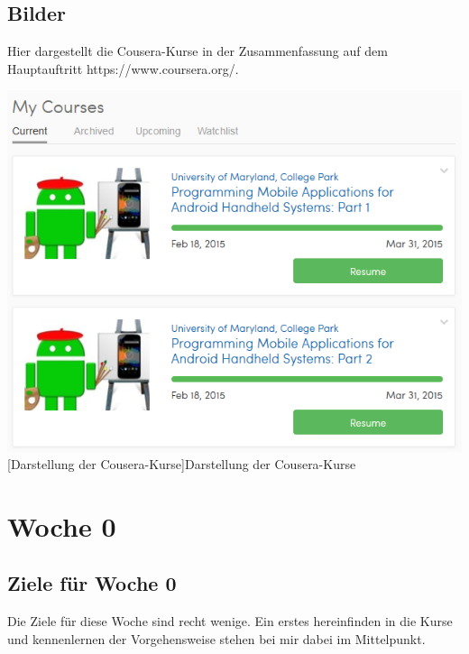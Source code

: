 \documentclass[12pt,a4paper,bibliography=totocnumbered,listof=totocnumbered]{scrartcl}
\begin{document}
\subsection{Bilder}
Hier dargestellt die Cousera-Kurse in der Zusammenfassung auf dem Hauptauftritt \textcolor[rgb]{0,0,1}{https://www.coursera.org/}.  

\vspace{1em}
\begin{minipage}{\linewidth}
	\centering
	\includegraphics[width=0.7\linewidth]{Bilder/overview.png}
	[Darstellung der Cousera-Kurse]{Darstellung der Cousera-Kurse\footnotemark }
	\label{fig:osgi}
\end{minipage}

\pagebreak

\section{Woche 0}

\subsection{Ziele für Woche 0}
Die Ziele für diese Woche sind recht wenige. Ein erstes hereinfinden in die Kurse und kennenlernen der Vorgehensweise stehen bei mir dabei im Mittelpunkt.
\end{document}
